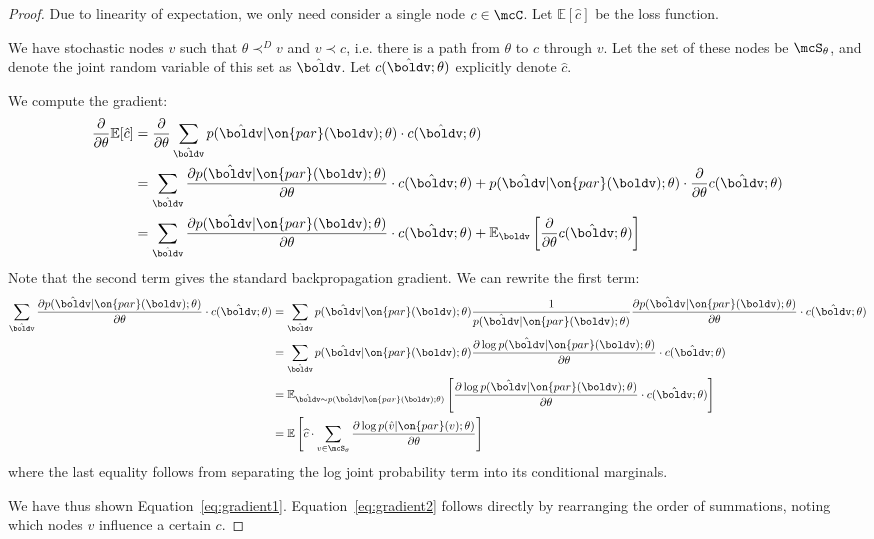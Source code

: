 \documentclass[12pt]{report}
\begin{document}
\begin{proof}
Due to linearity of expectation, we only need consider a single node $c \in \mcC$. Let $\mathbb{E}[\hat{c}]$ be the loss function.

We have stochastic nodes $v$ such that $\theta \prec^D v$ and $v \prec c$, i.e. there is a path from $\theta$ to $c$ through $v$. Let the set of these nodes be $\mcS_\theta$, and denote the joint random variable of this set as $\hat{\boldv}$. Let $c(\hat{\boldv} ; \theta)$ explicitly denote $\hat{c}$.

We compute the gradient:
\begin{align*}
\frac{\partial }{\partial \theta}\mathbb{E}[\hat{c}] &= \frac{\partial}{\partial \theta} \sum_{\hat{\boldv}} p(\hat{\boldv} | \on{par}(\boldv); \theta) \cdot c(\hat{\boldv}; \theta) \\
& = \sum_{\hat{\boldv}} \frac{ \partial  p(\hat{\boldv} | \on{par}(\boldv); \theta) } {\partial \theta} \cdot c(\hat{\boldv} ; \theta) + p(\hat{\boldv} | \on{par}(\boldv); \theta) \cdot \frac{\partial}{\partial\theta} c(\hat{\boldv}; \theta) \\
&= \sum_{\hat{\boldv}} \frac{ \partial  p(\hat{\boldv} | \on{par}(\boldv); \theta) } {\partial \theta} \cdot c(\hat{\boldv} ; \theta) + \mathbb{E}_{\boldv}\left[ \frac{\partial}{\partial\theta} c(\hat{\boldv}; \theta)  \right]
\end{align*}
Note that the second term gives the standard backpropagation gradient. We can rewrite the first term:
\begin{align*}
\sum_{\hat{\boldv}} \frac{ \partial  p(\hat{\boldv} | \on{par}(\boldv); \theta) } {\partial \theta} \cdot c(\hat{\boldv} ; \theta)
&= \sum_{\hat{\boldv}} p(\hat{\boldv} | \on{par}(\boldv); \theta) \frac{1}{p(\hat{\boldv}|\on{par}(\boldv);\theta)}\frac{ \partial  p(\hat{\boldv} | \on{par}(\boldv); \theta) } {\partial \theta} \cdot c(\hat{\boldv}; \theta) \\
&= \sum_{\hat{\boldv}} p(\hat{\boldv} | \on{par}(\boldv); \theta) \frac{ \partial  \log p(\hat{\boldv} | \on{par}(\boldv); \theta) } {\partial \theta} \cdot c(\hat{\boldv}; \theta) \\
 &= \mathbb{E}_{\hat{\boldv} \sim p(\hat{\boldv} | \on{par}(\boldv); \theta)} \left[ \frac{ \partial  \log p(\hat{\boldv} | \on{par}(\boldv); \theta) } {\partial \theta} \cdot c(\hat{\boldv} ; \theta) \right] \\
&= \mathbb{E}\left[ \widehat{c} \cdot \sum_{v \in \mcS_\theta} \frac{  \partial  \log p(\hat{v} | \on{par}(v); \theta) } {\partial \theta}  \right]
\end{align*}
where the last equality follows from separating the log joint probability term into its conditional marginals.

We have thus shown Equation~\ref{eq:gradient1}. Equation~\ref{eq:gradient2} follows directly by rearranging the order of summations, noting which nodes $v$ influence a certain $c$.

\end{proof}
\end{document}
